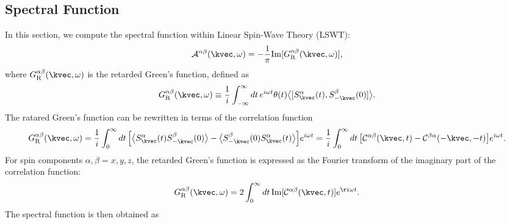 \subsection{Spectral Function}\label{subsec: Spectral Function}

In this section, we compute the spectral function within Linear Spin-Wave Theory (LSWT):
\begin{equation}
    \mathcal{A}^{\alpha\beta}(\kvec, \omega) = - \frac{1}{\pi} \mathrm{Im} [G^{\alpha\beta}_{\rm R} (\kvec, \omega)],
\end{equation}
where $G^{\alpha\beta}_{\rm R} (\kvec, \omega)$ is the retarded Green's function, defined as
\begin{equation}
    G^{\alpha\beta}_{\rm R} (\kvec, \omega) 
    \equiv  \frac{1}{i} \int_{-\infty}^{\infty} dt \, e^{i\omega t} \theta(t) \big\langle [S_{\kvec}^{\alpha} (t), S_{-\kvec}^{\beta} (0)] \big\rangle . 
\end{equation}
The ratared Green's function can be rewritten in terms of the correlation function
\begin{equation}
    G^{\alpha\beta}_{\rm R} (\kvec, \omega) 
    = \frac{1}{i} \int_{0}^{\infty} dt \, \Big[ \big\langle S_{\kvec}^{\alpha} (t) S_{-\kvec}^{\beta} (0) \big\rangle - \big\langle S_{-\kvec}^{\beta} (0) S_{\kvec}^{\alpha} (t) \big\rangle \Big] e^{i \omega t} 
    = \frac{1}{i} \int_{0}^{\infty} dt \, \big[ \mathcal{C}^{\alpha\beta}(\kvec, t) - \mathcal{C}^{\beta\alpha}(-\kvec, -t) \big] e^{i \omega t}.
\end{equation}
For spin components $\alpha, \beta = x, y, z$, the retarded Green's function is expressed as the Fourier transform of the imaginary part of the correlation function:
\begin{equation}
    G^{\alpha\beta}_{\rm R} (\kvec, \omega) 
    = 2 \int_{0}^{\infty} dt \, \mathrm{Im} [\mathcal{C}^{\alpha\beta}(\kvec, t) ] e^{\ri \omega t}.
\end{equation}
The spectral function is then obtained as

